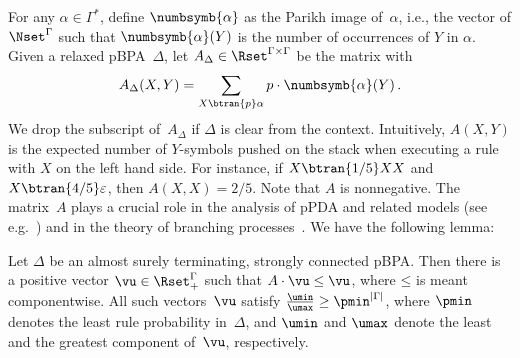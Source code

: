 For any $\alpha \in \Gamma^*$, define $\numbsymb{\alpha}$ as the Parikh image of~$\alpha$,
 i.e., the vector of $\Nset^{\Gamma}$ such that $\numbsymb{\alpha}(Y)$ is the number of occurrences of $Y$ in $\alpha$.
Given a relaxed pBPA~$\Delta$, let $A_\Delta \in \Rset^{\Gamma\times\Gamma}$ be the matrix with
 \[
  A_\Delta(X,Y) = \sum_{X \btran{p} \alpha} p \cdot \numbsymb{\alpha}(Y)\,.
 \]
We drop the subscript of~$A_\Delta$ if $\Delta$ is clear from the context.
Intuitively, $A(X,Y)$ is the expected number of $Y$-symbols pushed on the stack when executing a rule with $X$ on the left hand side.
For instance, if $X \btran{1/5} XX$ and $X \btran{4/5} \varepsilon$, then $A(X,X) = 2/5$.
Note that $A$ is nonnegative.
The matrix~$A$ plays a crucial role in the analysis of pPDA and related models (see e.g.~\cite{EY:RMC-SG-equations-JACM})
 and in the theory of branching processes~\cite{Harris:book}.
We have the following lemma:
\begin{lemma} \label{lem:cone-vector}
 Let $\Delta$ be an almost surely terminating, strongly connected pBPA.
 Then there is a positive vector $\vu \in \Rset_+^\Gamma$ such that
  $A \cdot \vu \le \vu$, where $\mathord{\le}$ is meant componentwise.
 All such vectors~$\vu$ satisfy $\frac{\umin}{\umax} \ge \pmin^{|\Gamma|}$,
  where $\pmin$ denotes the least rule probability in~$\Delta$,
  and $\umin$ and $\umax$ denote the least and the greatest component of~$\vu$, respectively.
\end{lemma}
